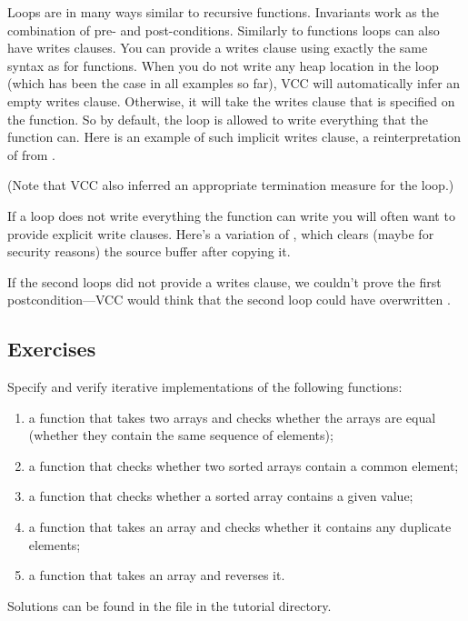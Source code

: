 Loops are in many ways similar to recursive functions.
Invariants work as the combination of pre- and post-conditions.
Similarly to functions loops can also have writes clauses.
You can provide a writes clause using exactly the same syntax
as for functions.
When you do not write any heap location in the loop (which has been
the case in all examples so far), VCC will automatically infer
an empty writes clause.
Otherwise, it will take the writes clause that is specified on
the function.
So by default, the loop is allowed to write everything that the function
can.
Here is an example of such implicit writes clause,
a reinterpretation of  from .

(Note that VCC also inferred an appropriate
termination measure for the  loop.)

If a loop does not write everything the function can write
you will often want to provide explicit write clauses.
Here's a variation of , which clears (maybe for security reasons)
the source buffer after copying it.


\noindent
If the second loops did not provide a writes clause,
we couldn't prove the first postcondition---VCC 
would think that the second loop could have overwritten .

\subsection*{Exercises}
Specify and verify iterative implementations of the following functions:
\begin{enumerate}
\item
a function that takes two arrays and checks whether
the arrays are equal (\ie whether they contain the same sequence of
elements); 
\item
a function that checks whether two sorted arrays
contain a common element;
\item
a function that checks whether a sorted array contains a given value;
\item
a function that takes an array and checks whether it
contains any duplicate elements;
\item
a function that takes an array and reverses it.
\end{enumerate}

Solutions can be found in the file  in the tutorial directory.

